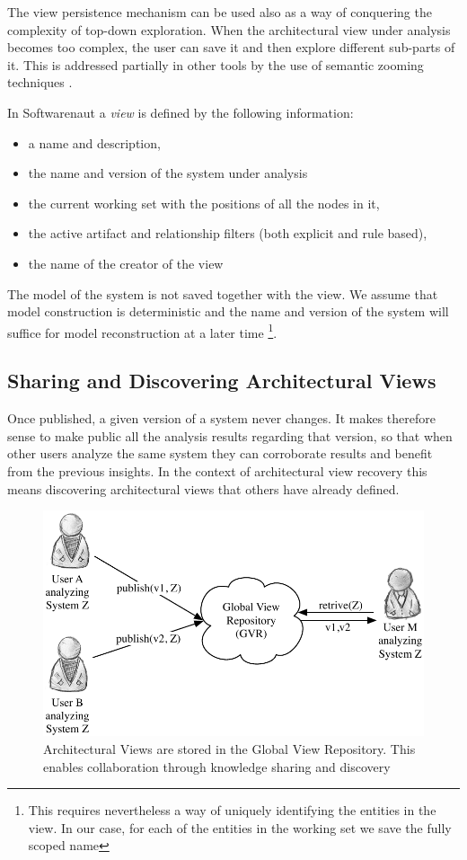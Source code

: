 \documentclass[preprint,12pt]{elsarticle}
\begin{document}
The view persistence mechanism can be used also as a way of conquering the complexity of top-down exploration. When the architectural view under analysis becomes too complex, the user can save it and then explore different sub-parts of it. This is addressed partially in other tools by the use of semantic zooming techniques \cite{storey-shrimp}. 

In Softwarenaut a {\em view} is defined by the following information: 

\begin{itemize}
\item a name and description,
\item the name and version of the system under analysis
\item the current working set with the positions of all the nodes in it,
\item the active artifact and relationship filters (both explicit and rule based), 
\item the name of the creator of the view
\end{itemize}

The model of the system is not saved together with the view. We assume that model construction is deterministic and the name and version of the system will suffice for model reconstruction at a later time \footnote{This requires nevertheless a way of uniquely identifying the entities in the view. In our case, for each of the entities in the working set we save the fully scoped name}.

\subsection {Sharing and Discovering Architectural Views}

Once published, a given version of a system never changes. It makes therefore sense to make public all the analysis results regarding that version, so that when other users analyze the same system they can corroborate results and benefit from the previous insights. In the context of architectural view recovery this means discovering architectural views that others have already defined. 

\begin{figure}[ht]
\begin{center}
\includegraphics[width=0.7\linewidth]{images/CollaborationConcept}
\caption{Architectural Views are stored in the Global View Repository. This enables collaboration through knowledge sharing and discovery}
\end{center}
\end{figure}
\end{document}
